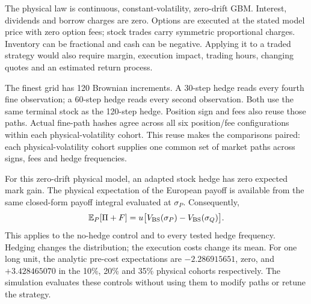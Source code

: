 \documentclass[8pt]{strategynet-journal}
\newcommand{\E}{\mathbb{E}}
\begin{document}
\begin{SNcolumns}
The physical law is continuous, constant-volatility, zero-drift GBM. Interest,
dividends and borrow charges are zero. Options are executed at the stated model price with zero option fees;
stock trades carry symmetric proportional charges. Inventory can be fractional
and cash can be negative. Applying it to a traded strategy would also require margin,
execution impact, trading hours, changing quotes and an estimated return process.

The finest grid has 120 Brownian increments. A 30-step hedge reads every fourth
fine observation; a 60-step hedge reads every second observation. Both use the
same terminal stock as the 120-step hedge. Position sign and fees also reuse
those paths. Actual fine-path hashes agree across all six position/fee
configurations within each physical-volatility cohort. This reuse makes the comparisons paired: each physical-volatility cohort
supplies one common set of market paths across signs, fees and hedge frequencies.

For this zero-drift physical model, an adapted stock hedge has zero expected
mark gain. The physical expectation of the European payoff is available from
the same closed-form payoff integral evaluated at $\sigma_P $. Consequently,
\begin{equation}
 \E_P[\Pi+F]=u\bigl[V_{\rm BS}(\sigma_P)-V_{\rm BS}(\sigma_Q)\bigr].
 \label{eq:mean}
\end{equation}
This applies to the no-hedge control and to every tested hedge frequency.
Hedging changes the distribution; the execution costs change its mean.
For one long unit, the analytic pre-cost expectations are $-2.286915651$, zero,
and $+3.428465070$ in the 10\%, 20\% and 35\% physical cohorts respectively.
The simulation evaluates these controls without using them to modify paths or
retune the strategy.
\end{SNcolumns}
\end{document}
